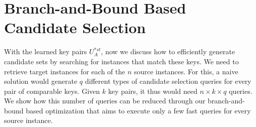 \section{Branch-and-Bound Based Candidate Selection} 
With the learned key pairs $U^{*st}_A$, now we discuss how to efficiently generate candidate sets by searching for instances that match these keys. We need to retrieve target instances for each of the $n$ source instances. For this, a naive solution would generate $q$ different types of candidate selection queries for every pair of comparable keys. Given $k$ key pairs, it thus would need $n \times k \times q$ queries. We show how this number of queries can be reduced through our branch-and-bound based optimization that aims to execute only a few fast queries for every source instance. 




